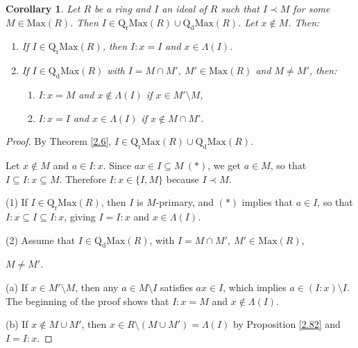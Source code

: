 \documentclass[12pt,leqno]{amsart}
\newtheorem{corollary}[theorem]{Corollary}
\theoremstyle{definition}
\begin{document}
\begin{corollary}\label{2.83} Let $R$ be a ring and $I$ an ideal of $R$ such that $I\prec M$ for some $M\in\mathrm{Max}(R)$. Then $I\in\mathrm {Q_rMax}( R)\cup\mathrm{Q_dMax}( R)$. Let $x\not\in M$. Then:
\begin{enumerate}
\item If $I\in\mathrm{Q_rMax}(R)$, then $I:x=I$ and $x\in\Lambda (I)$.
\item If $I\in\mathrm{Q_dMax}(R)$ with $I=M\cap M',\ M'\in\mathrm{Max}(R)$ and $M\neq M'$, then:
\begin{enumerate}
\item $I:x=M$ and $x\not\in \Lambda(I)$ if  $x\in M'\setminus M$,
\item $I:x=I$ and $x\in\Lambda(I)$  if  $x\not\in M\cap  M'$.\end{enumerate} 
\end{enumerate}
\end{corollary}
\begin{proof} By Theorem \ref{2.6}, $I\in\mathrm{Q_rMax}(R)\cup\mathrm{Q_dMax}( R)$. 

Let $x\not\in M$ and $a\in I:x$. Since $ax\in I\subseteq M\ (*)$, we get $a\in M$, so that $I\subseteq I:x\subseteq M$. Therefore $I:x\in\{I,M\}$ because $I\prec M$.

(1) If $I\in\mathrm{Q_rMax}(R)$, then $I$ is $M$-primary, and $(*)$ implies that $a\in I$, so that $I:x\subseteq I\subseteq I:x$, giving $I= I:x$ and $x\in\Lambda (I)$. 

(2) Assume that $I\in\mathrm{Q_dMax}(R)$, with $I=M\cap M',\ M'\in\mathrm {Max}(R),$

\noindent $ M\neq M'$. 

(a) If $x\in M'\setminus M$, then any $a\in M\setminus I$ satisfies $ax\in I$, which implies $a\in(I:x)\setminus I$. The beginning of the proof shows that $I:x=M$ and $x\not\in \Lambda(I)$.

(b) If $x\not\in M\cup M'$, then $x\in R\setminus(M\cup M')=\Lambda(I)$ by Proposition \ref{2.82} and $I= I:x$.
\end{proof}
\end{document}
